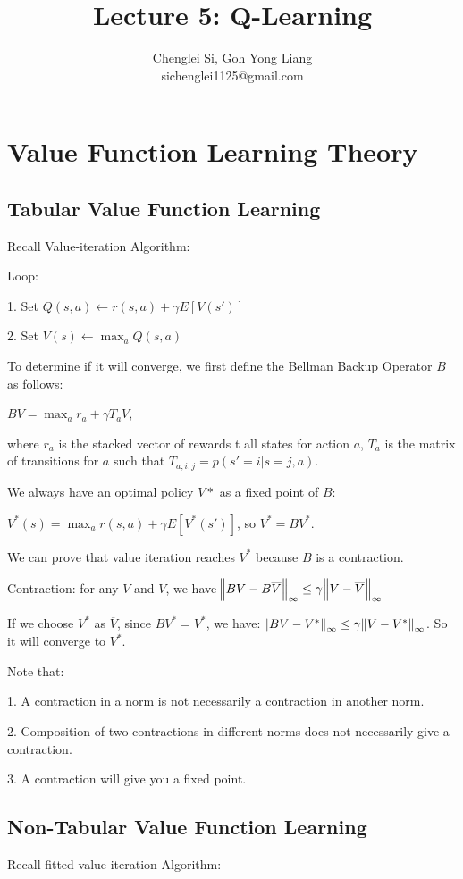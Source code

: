 \documentclass{article}
\title{Lecture 5: Q-Learning}
\author{
  Chenglei Si, Goh Yong Liang \\
  sichenglei1125@gmail.com \\
}
\begin{document}
\maketitle


\section{Value Function Learning Theory}
\subsection{Tabular Value Function Learning}
Recall Value-iteration Algorithm:

Loop:

1. Set $Q(s, a) \leftarrow r(s, a) + \gamma E[V(s')]$

2. Set $V(s) \leftarrow \max_{a} Q(s, a)$

To determine if it will converge, we first define the Bellman Backup Operator $B$ as follows:

$BV = \max_a r_a + \gamma T_a V$,

where $r_a$ is the stacked vector of rewards t all states for action $a$, $T_a$ is the matrix of transitions for $a$ such that $T_{a,i,j}=p(s'=i|s=j,a)$.

We always have an optimal policy $V*$ as a fixed point of $B$: 

$V^*(s) = \max_a r(s, a) + \gamma E[V^*(s')]$, so $V^*=BV^*$.

We can prove that value iteration reaches $V^*$ because $B$ is a contraction.

Contraction: for any $V$ and $\overline{V}$, we have $\norm{BV-B\overline{V}}_{\infty} \leq \gamma \norm{V-\overline{V}}_{\infty}$

If we choose $V^*$ as $\overline{V}$, since $BV^*=V^*$, we have: $\norm{BV-V^*}_{\infty} \leq \gamma \norm{V-V^*}_{\infty}$. So it will converge to $V^*$.

Note that:

1. A contraction in a norm is not necessarily a contraction in another norm. 

2. Composition of two contractions in different norms does not necessarily give a contraction.

3. A contraction will give you a fixed point.

\subsection{Non-Tabular Value Function Learning}
Recall fitted value iteration Algorithm:
\end{document}

